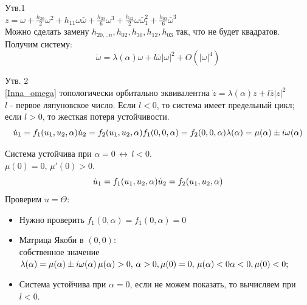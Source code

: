 Утв.1\\
$z = \omega + \frac{h_{20}}{2}\omega^2 + h_{11}\omega\bar{\omega} + \frac{h_{30}}{6}\omega^3 + \frac{h_{12}}{2}\omega\bar{\omega}_1^2 + \frac{h_{03}}{6}\bar{\omega}^3$ \\
Можно сделать замену $h_{20,..n},h_{02},h_{30},h_{12},h_{03}$ так, что не будет квадратов. \\
Получим систему: 
\[ \label{Inna_omega} 
\dot{\omega} = \lambda(\alpha) \omega + l \bar{\omega}|\omega|^2 + O(|\omega|^4)
\]

 Утв. 2\\
 \ref{Inna_omega} топологически орбитально эквивалентна $\dot{z} = \lambda(\alpha)z + l\bar{z}|z|^2$ \\
 $l$ - первое ляпуновское число. Если $l < 0$, то система имеет предельный цикл; если $l>0$, то жесткая потеря устойчивости. \\
 \[
 \dot{u}_1 = f_1(u_1,u_2,\alpha) \\
 \dot{u}_2 = f_2(u_1,u_2,\alpha) \\
 f_1(0,0,\alpha) = f_2(0,0,\alpha) \\
 \lambda(\alpha) = \mu(\alpha) \pm i \omega(\alpha) 
 \]
 
 Система устойчива при $\alpha = 0 \, \leftrightarrow \, l<0$. \\
 $\mu(0) = 0, \, \mu'(0) > 0$.\\
 \[
 \dot{u}_1 = f_1(u_1,u_2,\alpha) \\
 \dot{u}_2 = f_2(u_1,u_2,\alpha) \\
 \] 
 Проверим $u = \Theta$:
 \begin{itemize}
 	\item Нужно проверить $f_1(0,\alpha) = f_1(0,\alpha) = 0$
 	\item Матрица Якоби в $(0,0)$:\\
 	собственное значение $\lambda(\alpha) = \mu(\alpha) \pm i\omega(\alpha) \, \mu(\alpha)> 0, \, \alpha> 0, \mu(0) = 0, \, \mu(\alpha) <0 \\
 	\alpha< 0, \mu(0) < 0; $
 	\item Система устойчива при $\alpha = 0$, если не можем показать, то вычисляем при $l<0$.
 \end{itemize}

